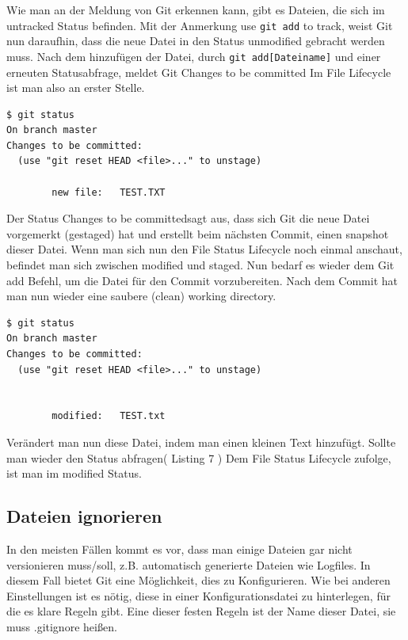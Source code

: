 \documentclass[12pt,a4paper,bibliography=totocnumbered,listof=totocnumbered]{scrartcl}
\begin{document}
Wie man an der Meldung von Git erkennen kann, gibt es Dateien, die sich im untracked Status befinden. Mit der Anmerkung use \lstinline|git add| to track, weist Git nun daraufhin, dass die neue Datei in den Status unmodified gebracht werden muss. Nach dem hinzufügen der Datei, durch \lstinline|git add[Dateiname]| und einer erneuten Statusabfrage, meldet Git Changes to be committed
Im File Lifecycle ist man also an erster Stelle.
\newpage
\vspace{1em}
\begin{lstlisting}[caption=Git Statusbefehl nach dem erzeugen einer Datei, label=lst:arduino]
$ git status
On branch master
Changes to be committed:
  (use "git reset HEAD <file>..." to unstage)

        new file:   TEST.TXT

\end{lstlisting}
Der Status \grqq Changes to be committed\grqq sagt aus, dass sich Git die neue Datei vorgemerkt (gestaged) hat und erstellt beim nächsten Commit, einen snapshot dieser Datei. Wenn man sich nun den File Status Lifecycle noch einmal anschaut, befindet man sich zwischen modified und staged. Nun bedarf es wieder dem Git add Befehl, um die Datei für den Commit vorzubereiten. Nach dem Commit hat man nun wieder eine saubere (clean) working directory. 

\vspace{1em}
\begin{lstlisting}[caption=Git Statusbefehl nach dem verändern einer Datei, label=lst:arduino]
$ git status
On branch master
Changes to be committed:
  (use "git reset HEAD <file>..." to unstage)

      
        modified:   TEST.txt

\end{lstlisting}
Verändert man nun diese Datei, indem man einen kleinen Text hinzufügt. Sollte man wieder den Status abfragen( Listing 7 )
Dem File Status Lifecycle zufolge, ist man im modified Status. 

\subsection{Dateien ignorieren}
In den meisten Fällen kommt es vor, dass man einige Dateien gar nicht versionieren muss/soll, z.B. automatisch generierte Dateien wie Logfiles. In diesem Fall bietet Git eine Möglichkeit, dies zu Konfigurieren. Wie bei anderen Einstellungen ist es nötig, diese in einer Konfigurationsdatei zu hinterlegen, für die es klare Regeln gibt. Eine dieser festen Regeln ist der Name dieser Datei, sie muss .gitignore heißen.
\end{document}
